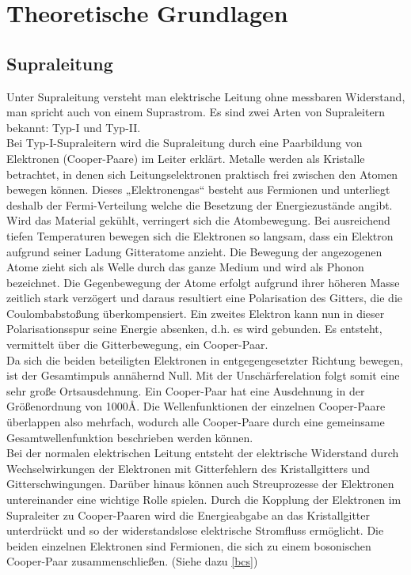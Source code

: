 \documentclass[12pt]{article}
\begin{document}
\section{Theoretische Grundlagen}
\subsection{Supraleitung}
Unter Supraleitung versteht man elektrische Leitung ohne messbaren Widerstand, man spricht auch von einem Suprastrom.
Es sind zwei Arten von Supraleitern bekannt: Typ-I und Typ-II. \\

Bei Typ-I-Supraleitern wird die Supraleitung durch eine Paarbildung von Elektronen (Cooper-Paare) im Leiter erklärt.
Metalle werden als Kristalle betrachtet, in denen sich Leitungselektronen praktisch frei zwischen den Atomen bewegen können. Dieses „Elektronengas“ besteht aus Fermionen und unterliegt deshalb der Fermi-Verteilung welche die Besetzung der Energiezustände angibt. Wird das Material gekühlt, verringert sich die Atombewegung. Bei ausreichend tiefen Temperaturen bewegen sich die Elektronen so langsam, dass ein Elektron aufgrund seiner Ladung Gitteratome anzieht. Die Bewegung der angezogenen Atome zieht sich als Welle durch das ganze Medium und wird als Phonon bezeichnet. Die Gegenbewegung der Atome erfolgt aufgrund ihrer höheren Masse zeitlich stark verzögert und daraus resultiert eine Polarisation des Gitters, die die Coulombabstoßung überkompensiert. Ein zweites Elektron kann nun in dieser Polarisationsspur seine Energie absenken, d.h. es wird gebunden. Es entsteht, vermittelt über die Gitterbewegung, ein Cooper-Paar.\\

Da sich die beiden beteiligten Elektronen in entgegengesetzter Richtung bewegen, ist der Gesamtimpuls annähernd Null.
Mit der Unschärferelation folgt somit eine sehr große Ortsausdehnung. Ein Cooper-Paar hat eine Ausdehnung in der Größenordnung von 1000\AA. Die Wellenfunktionen der einzelnen Cooper-Paare überlappen also mehrfach, wodurch alle Cooper-Paare durch eine gemeinsame Gesamtwellenfunktion beschrieben werden können.\\

Bei der normalen elektrischen Leitung entsteht der elektrische Widerstand durch Wechselwirkungen der Elektronen mit Gitterfehlern des Kristallgitters und Gitterschwingungen. Darüber hinaus können auch Streuprozesse der Elektronen untereinander eine wichtige Rolle spielen. Durch die Kopplung der Elektronen im Supraleiter zu Cooper-Paaren wird die Energieabgabe an das Kristallgitter unterdrückt und so der widerstandslose elektrische Stromfluss ermöglicht. Die beiden einzelnen Elektronen sind Fermionen, die sich zu einem bosonischen Cooper-Paar zusammenschließen. (Siehe dazu \ref{bcs})\\
\end{document}
